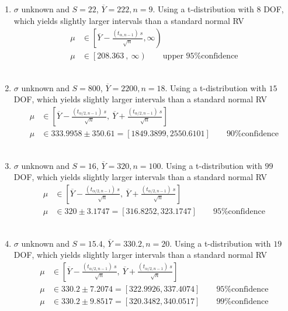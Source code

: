 \begin{enumerate}
	
	\item $ \sigma $ unknown and $ S = 22 $, $ \overline{Y} = 222, n = 9$. Using a t-distribution with $ 8 $ DOF, which yields slightly larger intervals than a standard normal RV\\
	
		\begin{align}
			\mu &\in \left[ \overline{Y} - \frac{(t_{\alpha, n-1})\ s}{\sqrt{n}}, \infty \right) \nonumber \\
			\mu &\in \left[208.363\ ,\ \infty\right) \qquad \text{upper 95\% confidence}
		\end{align}\\
	
	
	\item $ \sigma $ unknown and $ S = 800 $, $ \overline{Y} = 2200, n = 18$. Using a t-distribution with $ 15 $ DOF, which yields slightly larger intervals than a standard normal RV\\
	
		\begin{align}
			\mu &\in \left[ \overline{Y} - \frac{(t_{\alpha/2, n-1})\ s}{\sqrt{n}}, \ \overline{Y} + \frac{(t_{\alpha/2, n-1})\ s}{\sqrt{n}} \right] \nonumber \\
			\mu &\in 333.9958 \pm 350.61 = [1849.3899, 2550.6101] \qquad \text{90\% confidence}
		\end{align}\\
	
	
	\item $ \sigma $ unknown and $ S = 16 $, $ \overline{Y} = 320, n = 100$. Using a t-distribution with $ 99 $ DOF, which yields slightly larger intervals than a standard normal RV\\
	
		\begin{align}
			\mu &\in \left[ \overline{Y} - \frac{(t_{\alpha/2, n-1})\ s}{\sqrt{n}}, \ \overline{Y} + \frac{(t_{\alpha/2, n-1})\ s}{\sqrt{n}} \right] \nonumber \\
			\mu &\in 320 \pm 3.1747 = [316.8252, 323.1747] \qquad \text{95\% confidence}
		\end{align}\\
	
	
	\item $ \sigma $ unknown and $ S = 15.4 $, $ \overline{Y} = 330.2, n = 20$. Using a t-distribution with $ 19 $ DOF, which yields slightly larger intervals than a standard normal RV\\
	
		\begin{align}
			\mu &\in \left[ \overline{Y} - \frac{(t_{\alpha/2, n-1})\ s}{\sqrt{n}}, \ \overline{Y} + \frac{(t_{\alpha/2, n-1})\ s}{\sqrt{n}} \right] \nonumber \\
			\mu &\in 330.2 \pm 7.2074 = [322.9926, 337.4074] \qquad \text{95\% confidence} \nonumber \\
			\mu &\in 330.2 \pm 9.8517 = [320.3482, 340.0517] \qquad \text{99\% confidence}
		\end{align}\\
	

\end{enumerate}
